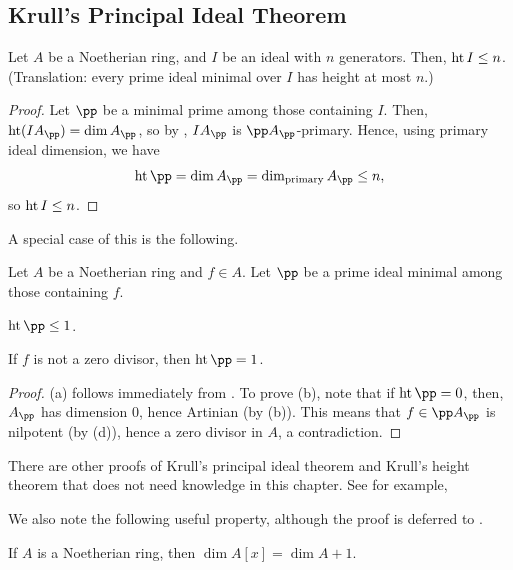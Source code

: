 \subsection{Krull's Principal Ideal Theorem}
\begin{theorem}
\label{thm:krull_height}
Let $A$ be a Noetherian ring, and $I$ be an ideal with
$n$ generators. Then, $\operatorname{ht} I \leq n$.
(Translation: every prime ideal minimal over $I$
has height at most $n$.)
\end{theorem}
\begin{proof}
    Let $\pp$ be a minimal prime among those containing $I$.
    Then, $\height(IA_\pp) = \dim A_\pp$, so by
    , $IA_\pp$ is $\pp A_\pp$-primary.
    Hence, using primary ideal dimension, we have
    $$\height \pp = \dim A_\pp  = \dimP A_\pp \leq n,$$
    so $\operatorname{ht} I \leq n$.
\end{proof}
A special case of this is the following.
\begin{corollary}
\label{cor:krull_principal}
Let $A$ be a Noetherian ring and $f\in A$. 
Let $\pp$ be a prime ideal minimal among those containing $f$.
\begin{alphenum}
    \item $\height\pp \leq 1$.
    \item If $f$ is not a zero divisor, then $\height \pp = 1$.
\end{alphenum}
\end{corollary}
\begin{proof}
    (a) follows immediately from .
    To prove (b), note that if $\height\pp = 0$,
    then, $A_\pp$ has dimension $0$, hence Artinian
    (by  (b)).
    This means that $f\in \pp A_\pp$ is nilpotent
    (by  (d)), hence
    a zero divisor in $A$, a contradiction.
\end{proof}
\begin{remark}
    There are other proofs of Krull's principal ideal theorem
    and Krull's height theorem that does not need
    knowledge in this chapter.
    See for example, \cite[\S 12.3]{vakil}
\end{remark}
We also note the following useful property,
although the proof is deferred to .
\begin{proposition}
    \label{prop:dim_poly}
    If $A$ is a Noetherian ring, then $\dim A[x] = \dim A + 1$.
\end{proposition}
%
%
%
%
%
%
